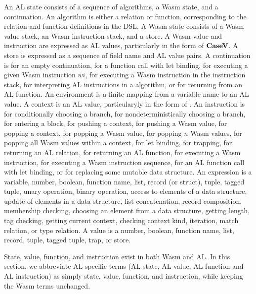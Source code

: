 An AL state consists of a sequence of algorithms, a Wasm state, and a
continuation.
An algorithm is either a relation or function, corresponding to the relation
and function definitions in the DSL.
A Wasm state consists of a Wasm value stack, an Wasm instruction stack, and a
store.
A Wasm value and instruction are expressed as AL values, particularly in the
form of $\textbf{CaseV}$.
A store is expressed as a sequence of field name and AL value pairs.
A continuation is \mt{} for an empty continuation, \call{} for a function call
with let binding, \exe{} for executing a given Wasm instruction $wi$, \wasm{}
for executing a Wasm instruction in the instruction stack, \algo{} for
interpreting AL instructions in a algorithm, or \ret{} for returning from an AL
function.
An environment is a finite mapping from a variable name to an AL value.
A context is an AL value, particularyly in the form of \casev{}.
An instruction is \ifi{} for conditionally choosing a branch, \eitheri{} for
nondeterministically choosing a branch, \enteri{} for entering a block,
\pushctxi{} for pushing a context, \pushi{} for pushing a Wasm value,
\popctxi{} for popping a context, \popi{} for popping a Wasm value, \popni{}
for popping $n$ Wasm values, \popalli{} for popping all Wasm values within a
context,  for let binding, \trapi{} for trapping, \returnreli{} for
returning an AL relation, \returnfunci{} for returning an AL function,
\executei{} for executing a Wasm instruction, \executeseqi{} for executing a
Wasm instruction sequence, \calli{} for an AL function call with let binding,
or \replacei{} for replacing some mutable data structure.
An expression is a variable, number, boolean, function name, list, record (or
struct), tuple, tagged tuple, unary operation, binary operation, access to
elements of a data structure, update of elements in a data structure, list
concatenation, record composition, membership checking, choosing an element from
a data structure, getting length, tag checking, getting current context,
checking context kind, iteration, match relation, or type relation.
A value is a number, boolean, function name, list, record, tuple, tagged tuple,
trap, or store.


State, value, function, and instruction exist in both Wasm and AL. In this
section, we abbreviate AL-specific terms (AL state, AL value, AL function and
AL instruction) as simply state, value, function, and instruction, while
keeping the Wasm terms unchanged.




